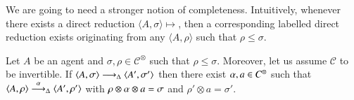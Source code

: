 \documentclass[main.tex]{subfiles}
\begin{document}
We are going to need a stronger notion of completeness. Intuitively, whenever there exists a direct reduction $\langle A, \sigma \rangle \mapsto$, then a corresponding labelled direct reduction exists originating from any $\langle A, \rho \rangle$ such that $\rho \leq \sigma$.

\begin{lemma}[Completeness]\label{lemma:completeness}
Let $A$ be an agent and $\sigma, \rho \in \mathcal{C}^\otimes$ such that $\rho \leq \sigma$.
%
Moreover, let us assume $\mathcal{C}$ to be invertible.
%
If $\langle A,\sigma \rangle \stackrel{}{\longrightarrow}_\Delta \langle A',\sigma' \rangle$ then there exist $\alpha, a \in C^\otimes$ such that
$\langle A,\rho \rangle \stackrel{\alpha}{\longrightarrow}_\Delta \langle A',\rho' \rangle$ with $\rho \otimes \alpha \otimes a = \sigma$ and $\rho' \otimes a = \sigma'$.
\end{lemma}
\end{document}
